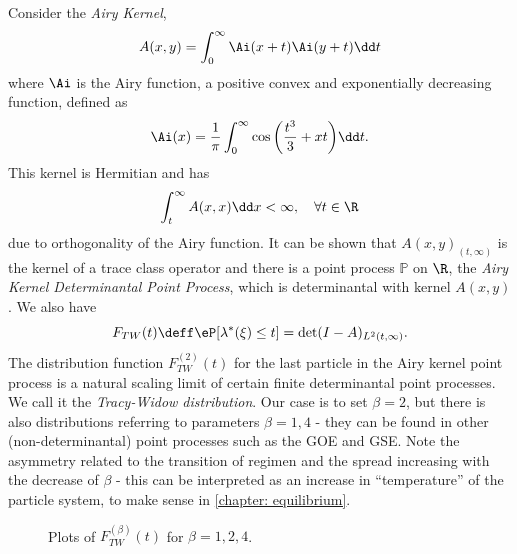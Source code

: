 \begin{exemplo}
	Consider the \textit{Airy Kernel},
	\begin{equation}
		A(x, y) = \int_{0}^{\infty} \Ai(x+t) \Ai(y + t) \dd t
	\end{equation}
	where $\Ai$ is the Airy function, a positive convex and exponentially decreasing function, defined as
	\begin{equation}
		\Ai(x) = \frac{1}{\pi} \int_{0}^{\infty} \cos{\left( \frac{t^3}{3} + x t \right)} \dd t.
	\end{equation}	
	This kernel is Hermitian and has 
	\begin{equation}
		\int_{t}^{\infty} A(x,x) \dd x < \infty, \quad \forall t \in \R
	\end{equation}
	due to orthogonality of the Airy function. It can be shown that $A(x,y)_{(t,\infty)}$ is the kernel of a trace class operator and there is a point process $\mathbb{P}$ on $\R$, the \textit{Airy Kernel Determinantal Point Process}, which is determinantal with kernel $A(x,y)$. We also have
	\begin{equation}
		F_{TW}(t) \deff \eP[\lambda^*(\xi) \leq t] = \det(I - A)_{L^2(t, \infty)}.
	\end{equation} 
	The distribution function $F_{TW}^{(2)}(t)$ for the last particle in the Airy kernel point process is a natural scaling limit of certain finite determinantal point processes. We call it the \textit{Tracy-Widow distribution}. Our case is to set $\beta = 2$, but there is also distributions referring to parameters $\beta = 1, 4$ - they can be found in other (non-determinantal) point processes such as the GOE and GSE. Note the asymmetry related to the transition of regimen and the spread increasing with the decrease of $\beta$ - this can be interpreted as an increase in \enquote{temperature} of the particle system, to make sense in \autoref{chapter: equilibrium}.
	\begin{figure}[H]
		\centering
	\caption{Plots of $F_{TW}^{(\beta)}(t)$ for $\beta = 1, 2, 4$.}
	\end{figure}
\end{exemplo}

